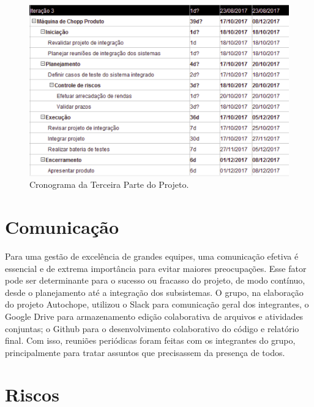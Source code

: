 			\begin{figure}[H]
				\centering
				\includegraphics[scale= 0.7]{figuras/cronograma3.png}
				\caption{Cronograma da Terceira Parte do Projeto.}
				\label{cronograma3}
			\end{figure}

	\section[Comunicação]{Comunicação}

		Para uma gestão de excelência de grandes equipes, uma comunicação efetiva é essencial e de extrema importância 
		para evitar maiores preocupações. Esse fator pode ser determinante para o sucesso ou fracasso do projeto, de 
		modo contínuo, desde o planejamento até a integração dos subsistemas. O grupo, na elaboração do projeto 
		Autochope, utilizou o Slack para comunicação geral dos integrantes, o Google Drive para armazenamento edição 
		colaborativa de arquivos e atividades conjuntas; o Github para o desenvolvimento colaborativo do código e 
		relatório final. Com isso, reuniões periódicas foram feitas com os integrantes do grupo, principalmente para 
		tratar assuntos que precisassem da presença de todos.

	\section[Riscos]{Riscos}

